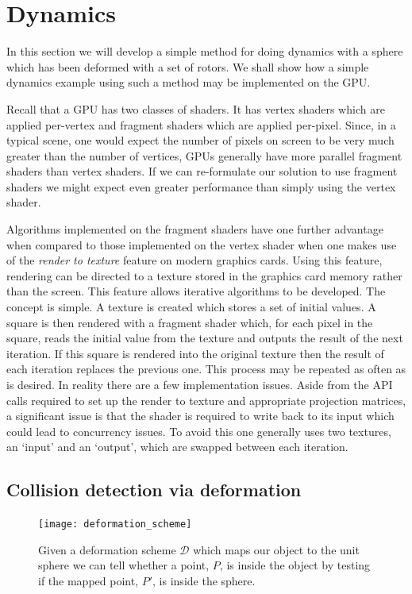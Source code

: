 \section{Dynamics}

In this section we will develop a simple method for doing dynamics with a sphere
which has been deformed with a set of rotors. We shall show how a simple dynamics example
using such a method may be implemented on the GPU.

Recall that a GPU has two classes of shaders. It has vertex shaders which are applied
per-vertex and fragment shaders which are applied per-pixel. Since, in a typical scene,
one would expect the number of pixels on screen to be very much greater than the number
of vertices, GPUs generally have more parallel fragment shaders than vertex shaders.
If we can re-formulate our solution to use fragment shaders we might expect even
greater performance than simply using the vertex shader.

Algorithms implemented on the fragment shaders have one further 
advantage when compared to those implemented on the vertex shader when one makes use
of the \emph{render to texture} feature on modern graphics cards. Using this feature,
rendering can be directed to a texture stored in the graphics card memory rather than the
screen. This feature allows iterative algorithms to be developed.
The concept is simple. A texture is created which stores a set of initial values. 
A square is then rendered with a fragment shader which, for each pixel in the square,
reads the initial value from the texture and outputs the result of the next iteration.
If this square is rendered into the original texture then the result of each iteration
replaces the previous one. This process may be repeated as often as is desired.
In reality there are a few implementation issues. Aside from the API calls required to
set up the render to texture and appropriate projection matrices, a significant issue is
that the shader is required to write back to its input which could lead to
concurrency issues. To avoid this one generally uses two textures, an `input' and an `output',
which are swapped between each iteration.

\subsection{Collision detection via deformation}

\begin{figure}
\centering
\texttt{[image: deformation\_scheme]}
\caption{\label{fig:deformation_scheme}Given a deformation scheme $\mathcal{D}$ which maps
  our object to the unit sphere we can tell whether a point, $P$, is inside the object by
          testing if the mapped point, $P'$, is inside the sphere.}
\end{figure}

